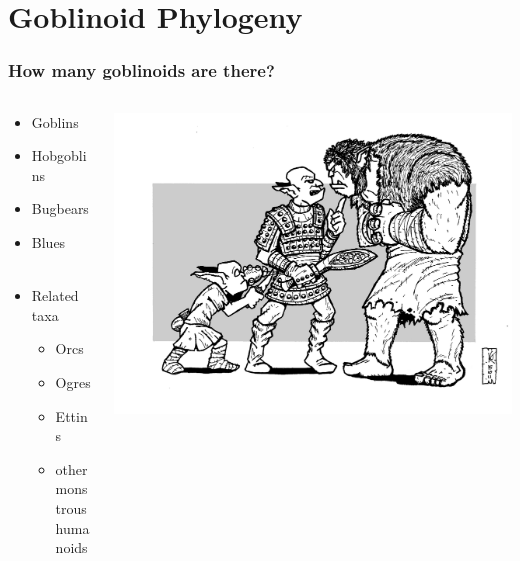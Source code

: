 \documentclass{beamer}\usepackage{graphicx, color}
\begin{document}
\section{Goblinoid Phylogeny}
\begin{frame}
  \frametitle{How many goblinoids are there?}
  
  \begin{columns}
    \begin{column}{0.5\textwidth}
      \begin{itemize}
        \item Goblins
        \item Hobgoblins
        \item Bugbears
        \item Blues
        \\~\\
        \item Related taxa
        \begin{itemize}
          \item Orcs
          \item Ogres
          \item Ettins
          \item other monstrous humanoids
        \end{itemize}
      \end{itemize}
    \end{column}

    \begin{column}{0.5\textwidth}
      \includegraphics[width = \textwidth, keepaspectratio = true]{goblinoids}
    \end{column}

  \end{columns}

\end{frame}
\end{document}

